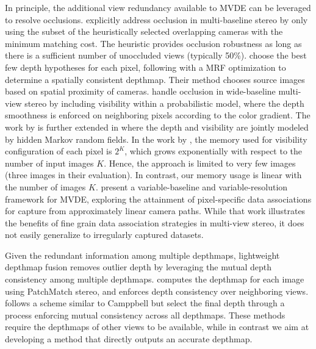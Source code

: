 In principle, the additional view  redundancy available to MVDE can be leveraged to resolve occlusions. \citet{handle_occlusion2001} explicitly address occlusion in multi-baseline stereo by only using the subset of the heuristically selected overlapping cameras with the minimum matching cost. The heuristic provides occlusion robustness as long as there is a sufficient number of unoccluded views (typically 50\%). \citet{MultiHypothesis_ECCV2008} choose the best few depth hypotheses for each pixel, following with a MRF optimization to determine a spatially consistent depthmap. Their method chooses source images based on spatial proximity of cameras. \citet{Strecha_BayesModelCVPR2004} handle occlusion in wide-baseline multi-view stereo by including visibility within a probabilistic model, where the depth smoothness is enforced on neighboring pixels according to the color gradient. The work by \citet{Strecha_BayesModelCVPR2004} is further extended in \citet{CombinedDepthOutlier} where the depth and visibility are jointly modeled by hidden Markov random fields. In the work by \citet{CombinedDepthOutlier}, the memory used for visibility configuration of each pixel is $2^K$, which grows exponentially with respect to the number of input images $K$. Hence, the approach is limited to very few images (three images in their evaluation). In contrast, our memory usage is linear with the number of images $K$. 
\citet{Gallup08} present a variable-baseline and variable-resolution framework for MVDE, exploring the attainment of pixel-specific data associations for capture from approximately linear camera paths. While that work illustrates the benefits of fine grain data association strategies in multi-view stereo, it does not easily generalize to irregularly captured datasets. 

Given the redundant information among multiple depthmaps, lightweight depthmap fusion removes outlier depth by leveraging the mutual depth consistency among multiple depthmaps.  \citet{Shen_TIP2013} computes the depthmap for each image using PatchMatch \mbox{stereo}, and enforces depth consistency over neighboring views. \citet{LeastCommitment_3DIMPVT2012} follows a scheme similar to Camppbell \citet{MultiHypothesis_ECCV2008} but select the final depth through a process enforcing mutual consistency across all depthmaps. These methods require the depthmaps of other views to be available, while in contrast we aim at developing a method that directly outputs an accurate depthmap. 


